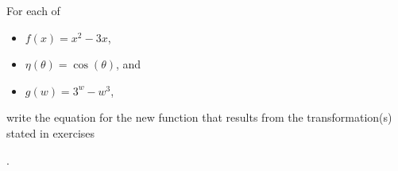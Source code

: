 {\noindent For each of 
\begin{itemize}
	\item $f(x)=x^2-3x$,
	\item $\eta(\theta) = \cos{(\theta)}$, and
	\item $g(w)=3^w-w^3$,
\end{itemize}
write the equation for the new function that results from the transformation(s) stated in exercises}
{.}
